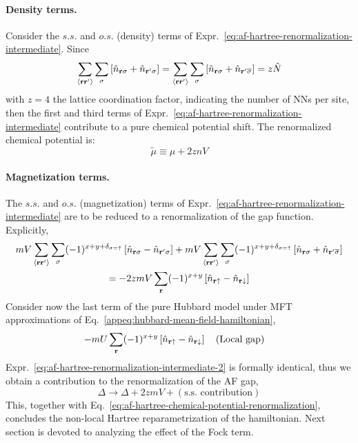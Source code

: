 \paragraph{Density terms.}

Consider the $s.s.$ and $o.s.$ (density) terms of Expr.~\eqref{eq:af-hartree-renormalization-intermediate}. Since
\[
	\sum_{\ev{\mathbf{r}\mathbf{r}'}} \sum_\sigma \left[
		\hat n_{\mathbf{r}\sigma} + \hat n_{\mathbf{r}'\sigma}
	\right] = \sum_{\ev{\mathbf{r}\mathbf{r}'}} \sum_\sigma \left[
		\hat n_{\mathbf{r}\sigma} + \hat n_{\mathbf{r}'\overline{\sigma}}
	\right] = z \hat N
\]
with $z=4$ the lattice coordination factor, indicating the number of NNs per site, then the first and third terms of Expr.~\eqref{eq:af-hartree-renormalization-intermediate} contribute to a pure chemical potential shift. The renormalized chemical potential is:
\begin{equation}\label{eq:af-hartree-chemical-potential-renormalization}
	\tilde{\mu} \equiv \mu + 2znV
\end{equation}

\paragraph{Magnetization terms.}

The $s.s.$ and $o.s.$ (magnetization) terms of Expr.~\eqref{eq:af-hartree-renormalization-intermediate} are to be reduced to a renormalization of the gap function. Explicitly,
\begin{multline}
	mV \sum_{\ev{\mathbf{r}\mathbf{r}'}} \sum_\sigma (-1)^{x+y+\delta_{\sigma=\uparrow}} \left[
		\hat n_{\mathbf{r}\sigma} - \hat n_{\mathbf{r}'\sigma}
	\right] + mV \sum_{\ev{\mathbf{r}\mathbf{r}'}} \sum_\sigma (-1)^{x+y+\delta_{\sigma=\uparrow}} \left[
		\hat n_{\mathbf{r}\sigma} + \hat n_{\mathbf{r}'\overline{\sigma}}
	\right] \\
	= -2zmV \sum_\mathbf{r} (-1)^{x+y} \left[
		\hat n_{\mathbf{r}\uparrow} - \hat n_{\mathbf{r}\downarrow}
	\right] \label{eq:af-hartree-renormalization-intermediate-2}
\end{multline}
Consider now the last term of the pure Hubbard model under MFT approximations of Eq.~\eqref{appeq:hubbard-mean-field-hamiltonian},
\[
	- mU \sum_\mathbf{r} (-1)^{x+y} \left[
		\hat n_{\mathbf{r}\uparrow} - \hat n_{\mathbf{r}\downarrow}
	\right]
	\qq{(Local gap)}
\]
Expr.~\eqref{eq:af-hartree-renormalization-intermediate-2} is formally identical, thus we obtain a contribution to the renormalization of the AF gap,
\begin{equation}\label{eq:af-hartree-gap-os-renormalization}
	\Delta \to \Delta + 2zmV + (\text{s.s. contribution})
\end{equation}
This, together with Eq.~\eqref{eq:af-hartree-chemical-potential-renormalization}, concludes the non-local Hartree reparametrization of the hamiltonian. Next section is devoted to analyzing the effect of the Fock term.

